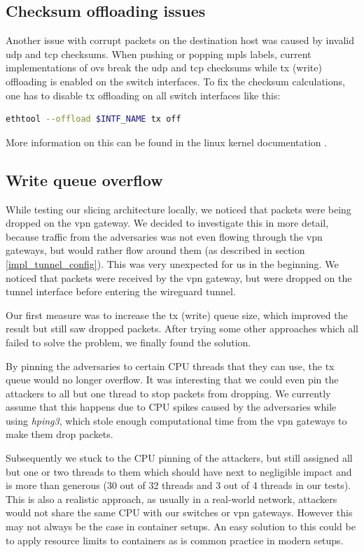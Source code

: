 \subsection{Checksum offloading issues}
Another issue with corrupt packets on the destination host was caused by invalid \acrshort{udp} and \acrshort{tcp} checksums. When pushing or popping \acrshort{mpls} labels, current implementations of \Gls{ovs} break the \acrshort{udp} and \acrshort{tcp} checksums while \acrshort{tx} (write) offloading is enabled on the switch interfaces. To fix the checksum calculations, one has to disable \acrshort{tx} offloading on all switch interfaces like this:

\begin{lstlisting}[language=bash]
ethtool --offload $INTF_NAME tx off
\end{lstlisting}

More information on this can be found in the linux kernel documentation \cite{txoffload}.

\subsection{Write queue overflow}
While testing our slicing architecture locally, we noticed that packets were being dropped on the \acrshort{vpn} gateway. We decided to investigate this in more detail, because traffic from the adversaries was not even flowing through the \acrshort{vpn} gateways, but would rather flow around them (as described in section \ref{impl_tunnel_config}). This was very unexpected for us in the beginning. We noticed that packets were received by the \acrshort{vpn} gateway, but were dropped on the tunnel interface before entering the \gls{wireguard} tunnel.

Our first measure was to increase the \acrshort{tx} (write) queue size, which improved the result but still saw dropped packets. After trying some other approaches which all failed to solve the problem, we finally found the solution.

By pinning the adversaries to certain CPU threads that they can use, the \acrshort{tx} queue would no longer overflow. It was interesting that we could even pin the attackers to all but one thread to stop packets from dropping. We currently assume that this happens due to CPU spikes caused by the adversaries while using \textit{hping3}, which stole enough computational time from the \acrshort{vpn} gateways to make them drop packets.

Subsequently we stuck to the CPU pinning of the attackers, but still assigned all but one or two threads to them which should have next to negligible impact and is more than generous (30 out of 32 threads and 3 out of 4 threads in our tests). This is also a realistic approach, as usually in a real-world network, attackers would not share the same CPU with our switches or \acrshort{vpn} gateways. However this may not always be the case in container setups. An easy solution to this could be to apply resource limits to containers as is common practice in modern setups.
